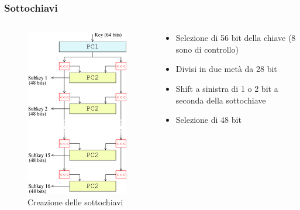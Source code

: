 		\begin{frame}
			\frametitle{Sottochiavi}	
			\begin{columns}
				\begin{column}{0.3\textwidth}
					\begin{center}
						\begin{figure}
							\includegraphics[scale=0.3]{img/deskey}
							\caption{Creazione delle sottochiavi}
						\end{figure}
					\end{center}
				\end{column}
				\begin{column}{0.65\textwidth}
					\begin{itemize}
						\item Selezione di 56 bit della chiave (8 sono di controllo)
						\item Divisi in due metà da 28 bit
						\item Shift a sinistra di 1 o 2 bit a seconda della sottochiave
						\item Selezione di 48 bit
					\end{itemize}
				\end{column}
			\end{columns}	
		\end{frame}
	
